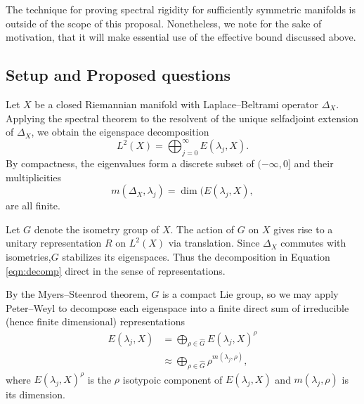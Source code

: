 \documentclass[11pt]{article}
\begin{document}
The technique for proving spectral rigidity for sufficiently symmetric manifolds is outside of the scope of this proposal. Nonetheless, we note for the sake of motivation, that it will make essential use of the effective bound discussed above. 
\\
\subsection{Setup and Proposed questions}

Let $X$ be a closed Riemannian manifold with Laplace--Beltrami operator $\Delta_X$. Applying the spectral theorem to the resolvent of the unique selfadjoint extension of $\Delta_X$, we obtain the eigenspace decomposition
\begin{equation}L^2(X) = \bigoplus_{j=0}^\infty E(\lambda_j,X). \label{eqn:decomp} \end{equation}
By compactness, the eigenvalues form a discrete subset of $(-\infty,0]$ and their multiplicities  
\[ m(\Delta_X,\lambda_j)=\dim (E(\lambda_j,X),\] are all finite.

Let $G$ denote the isometry group of $X$.  The action of $G$ on $X$ gives rise to a unitary representation $R$ on $L^2(X)$ via translation. Since $\Delta_X$ commutes with isometries,$G$ stabilizes its eigenspaces. Thus the decomposition in Equation \ref{eqn:decomp} direct in the sense of representations.     

By the Myers--Steenrod theorem, $G$ is a compact Lie group, so we may apply Peter--Weyl to decompose each eigenspace into a finite direct sum of irreducible (hence finite dimensional) representations
\begin{align}E(\lambda_j,X)&= \bigoplus_{\rho \in \hat{G}} E(\lambda_j, X)^\rho\\
 &\approx \bigoplus_{\rho \in \hat{G}}\rho^{m(\lambda_j,\rho)},\end{align}
  where  $E(\lambda_j,X)^\rho$ is the $\rho$ isotypoic component of $E(\lambda_j,X)$ and $m(\lambda_j,\rho)$ is its dimension.
  
\end{document}
